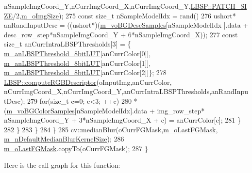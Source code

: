 \begin{DoxyCode}
      nSampleImgCoord\_Y,nCurrImgCoord\_X,nCurrImgCoord\_Y,\mbox{\hyperlink{class_l_b_s_p_aa98abb79a155d3a2b416c2ab32e74929}{LBSP::PATCH\_SIZE}}/2,\mbox{\hyperlink{class_background_subtractor_l_b_s_p_a732d5e6ae35fb0e858cadb3af5ce08a2}{m\_oImgSize}});
275                     \textcolor{keyword}{const} \textcolor{keywordtype}{size\_t} nSampleModelIdx = rand()%
276                     ushort* anRandInputDesc = ((ushort*)(\mbox{\hyperlink{class_background_subtractor_l_o_b_s_t_e_r_a3c49866ae652423b2173215957907d04}{m\_voBGDescSamples}}[nSampleModelIdx
      ].data + desc\_row\_step*nSampleImgCoord\_Y + 6*nSampleImgCoord\_X));
277                     \textcolor{keyword}{const} \textcolor{keywordtype}{size\_t} anCurrIntraLBSPThresholds[3] = \{
      \mbox{\hyperlink{class_background_subtractor_l_b_s_p_aefe69d94f08b2c4ba73ad1d254ad9153}{m\_anLBSPThreshold\_8bitLUT}}[anCurrColor[0]],
      \mbox{\hyperlink{class_background_subtractor_l_b_s_p_aefe69d94f08b2c4ba73ad1d254ad9153}{m\_anLBSPThreshold\_8bitLUT}}[anCurrColor[1]],
      \mbox{\hyperlink{class_background_subtractor_l_b_s_p_aefe69d94f08b2c4ba73ad1d254ad9153}{m\_anLBSPThreshold\_8bitLUT}}[anCurrColor[2]]\};
278                     \mbox{\hyperlink{class_l_b_s_p_a27a44cb6f6e3015ee26047bd3d84f892}{LBSP::computeRGBDescriptor}}(oInputImg,anCurrColor,
      nCurrImgCoord\_X,nCurrImgCoord\_Y,anCurrIntraLBSPThresholds,anRandInputDesc);
279                     \textcolor{keywordflow}{for}(\textcolor{keywordtype}{size\_t} c=0; c<3; ++c)
280                         *(\mbox{\hyperlink{class_background_subtractor_l_o_b_s_t_e_r_ac981b39f8ae7b28d3e4326d8e6be6332}{m\_voBGColorSamples}}[nSampleModelIdx].data + img\_row\_step*
      nSampleImgCoord\_Y + 3*nSampleImgCoord\_X + c) = anCurrColor[c];
281                 \}
282             \}
283         \}
284     \}
285     cv::medianBlur(oCurrFGMask,\mbox{\hyperlink{class_background_subtractor_l_b_s_p_adb6dc0af596c5592c91f9d8faa5c8a4b}{m\_oLastFGMask}},
      \mbox{\hyperlink{class_background_subtractor_l_b_s_p_a2585fe6e41e10af6da3e325dc20fe7f1}{m\_nDefaultMedianBlurKernelSize}});
286     \mbox{\hyperlink{class_background_subtractor_l_b_s_p_adb6dc0af596c5592c91f9d8faa5c8a4b}{m\_oLastFGMask}}.copyTo(oCurrFGMask);
287 \}
\end{DoxyCode}
Here is the call graph for this function\+:\nopagebreak
